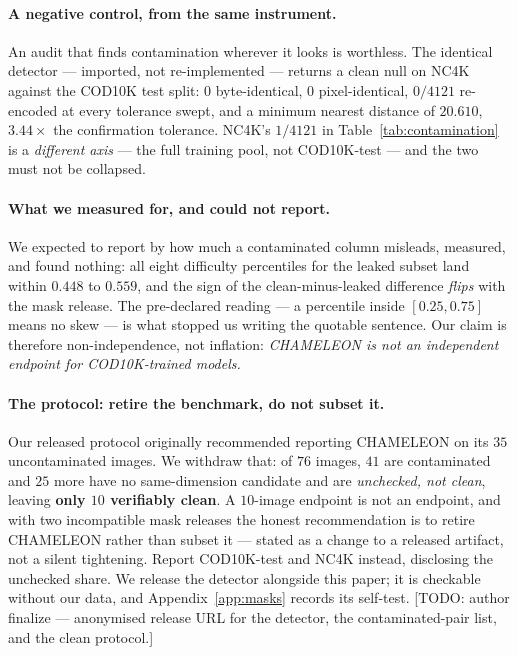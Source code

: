 \documentclass{article} %
\begin{document}
\paragraph{A negative control, from the same instrument.} An audit that finds contamination wherever
it looks is worthless. The identical detector --- imported, not re-implemented --- returns a clean null
on NC4K against the COD10K test split: $0$ byte-identical, $0$ pixel-identical, $0/4121$ re-encoded at
every tolerance swept, and a minimum nearest distance of $20.610$, $3.44\times$ the confirmation
tolerance. NC4K's $1/4121$ in Table~\ref{tab:contamination} is a \emph{different axis} --- the full
training pool, not COD10K-test --- and the two must not be collapsed.

\paragraph{What we measured for, and could not report.} We expected to report by how much a
contaminated column misleads, measured, and found nothing: all eight difficulty percentiles for the
leaked subset land within $0.448$ to $0.559$, and the sign of the clean-minus-leaked difference
\emph{flips} with the mask release. The pre-declared reading --- a percentile inside $[0.25,0.75]$
means no skew --- is what stopped us writing the quotable sentence. Our claim is therefore
non-independence, not inflation: \emph{CHAMELEON is not an independent endpoint for COD10K-trained
models.}

\paragraph{The protocol: retire the benchmark, do not subset it.} Our released protocol originally
recommended reporting CHAMELEON on its $35$ uncontaminated images. We withdraw that: of $76$ images,
$41$ are contaminated and $25$ more have no same-dimension candidate and are \emph{unchecked, not
clean}, leaving \textbf{only $10$ verifiably clean}. A $10$-image endpoint is not an endpoint, and with
two incompatible mask releases the honest recommendation is to retire CHAMELEON rather than subset it
--- stated as a change to a released artifact, not a silent tightening. Report COD10K-test and NC4K
instead, disclosing the unchecked share. We release the detector alongside this paper; it is checkable without our data, and
Appendix~\ref{app:masks} records its self-test. [TODO: author finalize --- anonymised release URL for
the detector, the contaminated-pair list, and the clean protocol.]
\end{document}

